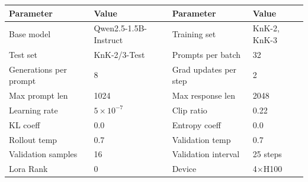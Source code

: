 \documentclass{article}
\theoremstyle{plain}
\theoremstyle{definition}
\theoremstyle{remark}
\begin{document}
\begin{table}[h]
  \centering
  \label{tab:config-1.5b-it}
  \begin{tcolorbox}[
    enhanced, hbox,
    title={Training setup of Qwen2.5-1.5B-Instruct},
    colback=teal!5, colframe=teal, coltext=black, coltitle=white,
    fonttitle=\bfseries, arc=1mm, boxrule=1pt, boxsep=1pt,
    left=2pt, right=2pt, top=0pt, bottom=2pt,
    toptitle=3pt, bottomtitle=3pt, center
  ]
    \small
    \renewcommand{\arraystretch}{1.2}
    \setlength{\tabcolsep}{8pt}
    \begin{tabular}{l|l|l|l}
      \textbf{Parameter} & \textbf{Value} & \textbf{Parameter} & \textbf{Value} \\
      \hline
      Base model & Qwen2.5-1.5B-Instruct & Training set & KnK-2, KnK-3 \\
      Test set & KnK-2/3-Test & Prompts per batch & 32 \\
      Generations per prompt & 8 & Grad updates per step & 2 \\
      Max prompt len & 1024 & Max response len & 2048 \\
      Learning rate & $5 \times 10^{-7}$ & Clip ratio & 0.22 \\
      KL coeff & 0.0 & Entropy coeff & 0.0 \\
      Rollout temp & 0.7 & Validation temp & 0.7 \\
      Validation samples & 16 & Validation interval & 25 steps \\
      Lora Rank & 0 & Device & 4$\times$H100 \\
    \end{tabular}
  \end{tcolorbox}
\end{table}

\clearpage



\end{document}
